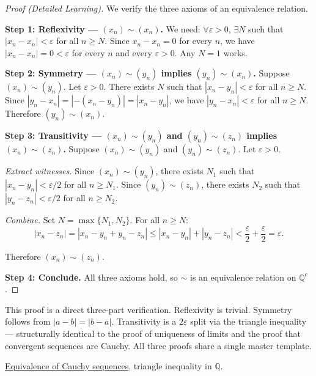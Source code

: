 \begin{proof}[Proof (Detailed Learning)]
We verify the three axioms of an equivalence relation.

\textbf{Step 1: Reflexivity — $(x_n) \sim (x_n)$.}
We need: $\forall \varepsilon > 0$, $\exists N$ such that
$|x_n - x_n| < \varepsilon$ for all $n \geq N$.
Since $x_n - x_n = 0$ for every $n$, we have $|x_n - x_n| = 0 < \varepsilon$
for every $n$ and every $\varepsilon > 0$.  Any $N = 1$ works.

\textbf{Step 2: Symmetry — $(x_n) \sim (y_n)$ implies $(y_n) \sim (x_n)$.}
Suppose $(x_n) \sim (y_n)$.  Let $\varepsilon > 0$.  There exists $N$ such
that $|x_n - y_n| < \varepsilon$ for all $n \geq N$.
Since $|y_n - x_n| = |-(x_n - y_n)| = |x_n - y_n|$, we have
$|y_n - x_n| < \varepsilon$ for all $n \geq N$.
Therefore $(y_n) \sim (x_n)$.

\textbf{Step 3: Transitivity — $(x_n) \sim (y_n)$ and $(y_n) \sim (z_n)$
implies $(x_n) \sim (z_n)$.}
Suppose $(x_n) \sim (y_n)$ and $(y_n) \sim (z_n)$.
Let $\varepsilon > 0$.

\emph{Extract witnesses.}  Since $(x_n) \sim (y_n)$, there exists $N_1$
such that $|x_n - y_n| < \varepsilon/2$ for all $n \geq N_1$.
Since $(y_n) \sim (z_n)$, there exists $N_2$ such that
$|y_n - z_n| < \varepsilon/2$ for all $n \geq N_2$.

\emph{Combine.}  Set $N = \max\{N_1, N_2\}$.  For all $n \geq N$:
\[
|x_n - z_n|
= |x_n - y_n + y_n - z_n|
\leq |x_n - y_n| + |y_n - z_n|
< \frac{\varepsilon}{2} + \frac{\varepsilon}{2}
= \varepsilon.
\]

Therefore $(x_n) \sim (z_n)$.

\textbf{Step 4: Conclude.}
All three axioms hold, so $\sim$ is an equivalence relation on $\mathbb{Q}^c$.
\end{proof}

\begin{remark*}
This proof is a direct three-part verification.  Reflexivity is trivial.
Symmetry follows from $|a - b| = |b - a|$.  Transitivity is a
$2\varepsilon$ split via the triangle inequality — structurally identical
to the proof of uniqueness of limits and the proof that convergent
sequences are Cauchy.  All three proofs share a single master template.
\end{remark*}

\begin{dependencies}
\hyperref[def:cauchy-equivalence]{Equivalence of Cauchy sequences},
triangle inequality in $\mathbb{Q}$.
\end{dependencies}
